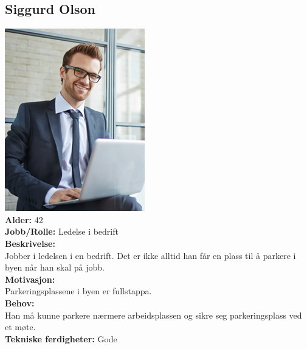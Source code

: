 \documentclass[12pt]{article}
\begin{document}
    \subsection{Siggurd Olson}
    \includegraphics[scale=1]{bilder/personaer/persona_siggurd.jpg}\\
    \textbf{Alder:} 42\\
    \textbf{Jobb/Rolle:} Ledelse i bedrift\\
    \textbf{Beskrivelse:}\\
    Jobber i ledelsen i en bedrift. Det er ikke alltid han får en plass til å parkere i byen når han skal på jobb.\\
    \textbf{Motivasjon:}\\
    Parkeringsplassene i byen er fullstappa.\\
    \textbf{Behov:}\\
    Han må kunne parkere nærmere arbeidsplassen og sikre seg parkeringsplass ved et møte.\\
    \textbf{Tekniske ferdigheter:} Gode
\end{document}
